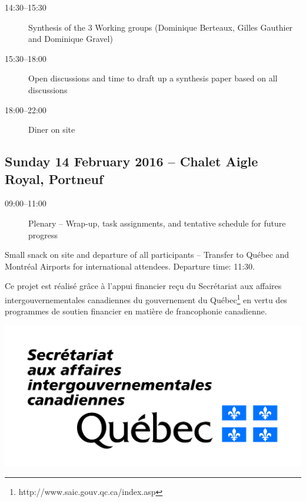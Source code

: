 \documentclass[10pt,letterpaper]{article}
\begin{document}
\begin{description}

    \item[14:30--15:30] Synthesis of the 3 Working groups (Dominique Berteaux, Gilles Gauthier and Dominique Gravel)
    \item[15:30--18:00] Open discussions and time to draft up a synthesis paper based on all discussions
    \item[18:00--22:00] Diner on site

\end{description}

\vspace{0.35cm}

\subsection*{Sunday 14 February 2016 -- Chalet Aigle Royal, Portneuf}

\vspace{0.35cm}

\begin{description}
    \item[09:00--11:00] Plenary -- Wrap-up, task assignments, and tentative schedule for future progress
\end{description}

\noindent Small snack on site and departure of all participants -- Transfer to Québec and Montréal Airports for international attendees. Departure time: 11:30.

\vspace{2cm}

\noindent{}Ce projet est réalisé grâce à l’appui financier reçu du Secrétariat aux affaires intergouvernementales canadiennes du gouvernement du Québec\footnote{http://www.saic.gouv.qc.ca/index.asp} en vertu des programmes de soutien financier en matière de francophonie canadienne.

\noindent{}\includegraphics[scale=0.05]{logo-saic}
\end{document}
